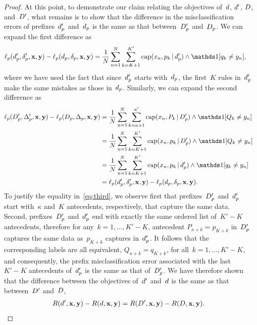 \begin{proof}
At this point, to demonstrate our claim relating the objectives
of~${d}$, ${d}'$, ${D}$, and~${D}'$, what remains is to
show that the difference in the misclassification errors
of prefixes~$d_p'$ and~$d_p$ is the same as that
between~$D_p'$ and~$D_p$.
%
We can expand the first difference as
\begin{align}
\Loss_p(\Prefix', \Labels', \x, \y) - \Loss_p(\Prefix, \Labels, \x, \y)
&= \frac{1}{N} \sum_{n=1}^N \sum_{k=K+1}^{K'}
  \Cap(x_n, p_k \given \Prefix') \wedge \one [ q_k \neq y_n ],
\end{align}
where we have used the fact that since~$d_p'$
starts with~$d_p$, the first~$K$ rules in~$d_p'$
make the same mistakes as those in~$d_p$.
%
Similarly, we can expand the second difference as
\begin{align}
\Loss_p(\PrefixB', \LabelsB', \x, \y) - \Loss_p(\PrefixB, \LabelsB, \x, \y)
&= \frac{1}{N} \sum_{n=1}^N \sum_{k=\kappa+1}^{\kappa'}
  \Cap(x_n, P_k \given \PrefixB') \wedge \one [ Q_k \neq y_n ] \nn \\
&= \frac{1}{N} \sum_{n=1}^N \sum_{k=K+1}^{K'}
  \Cap(x_n, p_k \given \PrefixB') \wedge \one [ Q_k \neq y_n ] \nn \\
&= \frac{1}{N} \sum_{n=1}^N \sum_{k=K+1}^{K'}
  \Cap(x_n, p_k \given \Prefix') \wedge \one [ q_k \neq y_n ] \label{eq:third} \\
&= \Loss_p(\Prefix', \Labels', \x, \y) - \Loss_p(\Prefix, \Labels, \x, \y) \nn.
\end{align}
To justify the equality in~\eqref{eq:third}, we observe first that
prefixes~$D_p'$ and~$d_p'$ start with~$\kappa$ and~$K$
antecedents, respectively, that capture the same data.
%
Second, prefixes~$D_p'$ and~$d_p'$ end with exactly
the same ordered list of~${K' - K}$ antecedents,
therefore for any~${k = 1, \dots, K' - K}$,
antecedent ${P_{\kappa + k} = p_{K + k}}$ in~$D_p'$
captures the same data as~$p_{K + k}$ captures in~$d_p'$.
%
It follows that the corresponding labels are all equivalent, \ie
${Q_{\kappa + k} = q_{K + k}}$, for all~${k = 1, \dots, K' - K}$,
and consequently, the prefix misclassification error associated
with the last~${K' - K}$ antecedents of~$d_p'$ is the same
as that of~$D_p'$.
%
We have therefore shown that the difference between the objectives
of~${d}'$ and~${d}$ is the same as that between~${D}'$ and~${D}$, \ie
\begin{align}
\Obj(\RL', \x, \y) - \Obj(\RL, \x, \y)
= \Obj(\RLB', \x, \y) - \Obj(\RLB, \x, \y).
\label{eq:equiv-analogous}
\end{align}


\end{proof}
